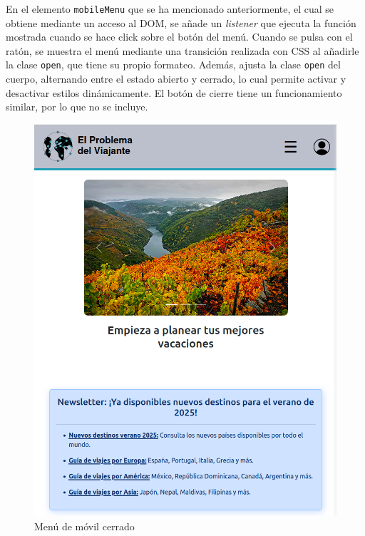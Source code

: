 \documentclass[11pt, a4paper]{book}
\begin{document}
	En el elemento \texttt{mobileMenu} que se ha mencionado anteriormente, el cual se obtiene mediante un acceso al DOM, se añade un \textit{listener} que ejecuta la función mostrada cuando se hace click sobre el botón del menú. Cuando se pulsa con el ratón, se muestra el menú mediante una transición realizada con CSS al añadirle la clase \texttt{open}, que tiene su propio formateo. Además, ajusta la clase \texttt{open} del cuerpo, alternando entre el estado abierto y cerrado, lo cual permite activar y desactivar estilos dinámicamente. El botón de cierre tiene un funcionamiento similar, por lo que no se incluye.
	
	\newpage
	
	\begin{figure} [H]
		\centering
		\includegraphics[height=0.4\textheight]{CSS/1-5 768.png}
		\caption{Menú de móvil cerrado}
	\end{figure}
\end{document}
